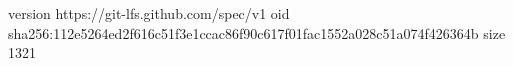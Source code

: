 version https://git-lfs.github.com/spec/v1
oid sha256:112e5264ed2f616c51f3e1ccac86f90c617f01fac1552a028c51a074f426364b
size 1321
